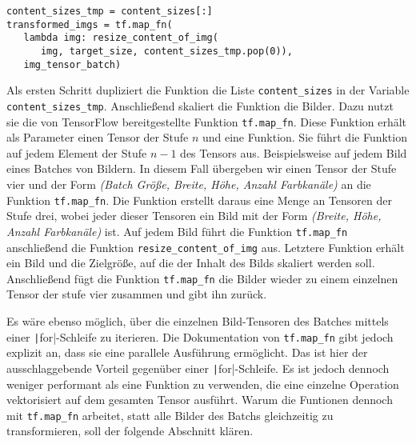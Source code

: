 \begin{code}
   \begin{verbatim}
content_sizes_tmp = content_sizes[:]
transformed_imgs = tf.map_fn(
   lambda img: resize_content_of_img(
      img, target_size, content_sizes_tmp.pop(0)), 
   img_tensor_batch)
\end{verbatim}
   \label{lst:content-scaling}
\end{code}

Als ersten Schritt dupliziert die Funktion die Liste \texttt{content_sizes} in der Variable \texttt{content_sizes_tmp}. Anschließend skaliert die Funktion die Bilder. Dazu nutzt sie die von TensorFlow bereitgestellte Funktion \texttt{tf.map_fn}. Diese Funktion erhält als Parameter einen Tensor der Stufe $n$ und eine Funktion. Sie führt die Funktion auf jedem Element der Stufe $n-1$ des Tensors aus. Beispielsweise auf jedem Bild eines Batches von Bildern. In diesem Fall übergeben wir einen Tensor der Stufe vier und der Form \emph{(Batch Größe, Breite, Höhe, Anzahl Farbkanäle)} an die Funktion \texttt{tf.map_fn}. Die Funktion erstellt daraus eine Menge an Tensoren der Stufe drei, wobei jeder dieser Tensoren ein Bild mit der Form \emph{(Breite, Höhe, Anzahl Farbkanäle)} ist.
Auf jedem Bild führt die Funktion \texttt{tf.map_fn} anschließend die Funktion \texttt{resize_content_of_img} aus. Letztere Funktion erhält ein Bild und die Zielgröße, auf die der Inhalt des Bilds skaliert werden soll. Anschließend fügt die Funktion \texttt{tf.map_fn} die Bilder wieder zu einem einzelnen Tensor der stufe vier zusammen und gibt ihn zurück. \cite{tf-map-fn}

Es wäre ebenso möglich, über die einzelnen Bild-Tensoren des Batches mittels einer \texttt|for|-Schleife zu iterieren. Die Dokumentation von \texttt{tf.map_fn} gibt jedoch explizit an, dass sie eine parallele Ausführung ermöglicht. Das ist hier der ausschlaggebende Vorteil gegenüber einer \texttt|for|-Schleife. Es ist jedoch dennoch weniger performant als eine Funktion zu verwenden, die eine einzelne Operation vektorisiert auf dem gesamten Tensor ausführt. Warum die Funtionen dennoch mit \texttt{tf.map_fn} arbeitet, statt alle Bilder des Batchs gleichzeitig zu transformieren, soll der folgende Abschnitt klären. \cite{tf-map-fn}

